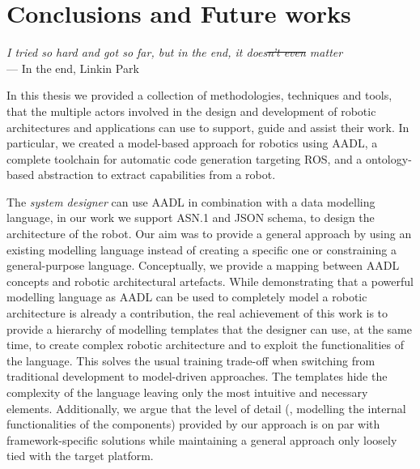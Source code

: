 \chapter[Conclusions and Future works]{Conclusions and Future works}\label{ch:Conclusions}

\begin{flushright}{\slshape I tried so hard and got so far, but in the end, it does\st{n't even} matter} \\ \medskip
    ---  In the end, Linkin Park
\end{flushright}


In this thesis we provided a collection of methodologies, techniques and tools, that the multiple actors involved in the design and development of robotic architectures and applications can use to support, guide and assist their work. In particular, we created a model-based approach for robotics using AADL, a complete toolchain for automatic code generation targeting ROS, and a ontology-based abstraction  to extract capabilities from a robot.

The \textit{system designer} can use AADL in combination with a data modelling language, in our work we support ASN.1 and JSON schema, to design the architecture of the robot. Our aim was to provide a general approach by using an existing modelling language instead of creating a specific one or constraining a general-purpose language. Conceptually, we provide a mapping between AADL concepts and robotic architectural artefacts. While demonstrating that a powerful modelling language as AADL can be used to completely model a robotic architecture is already a contribution, the real achievement of this work is to provide a hierarchy of modelling templates that the designer can use, at the same time, to create complex robotic architecture and to exploit the functionalities of the language. This solves the usual training trade-off when switching from traditional development to model-driven approaches. The templates hide the complexity of the language leaving only the most intuitive and necessary elements. Additionally, we argue that the level of detail (\ie, modelling the internal functionalities of the components) provided by our approach is on par with framework-specific solutions while maintaining a general approach only loosely tied with the target platform.

